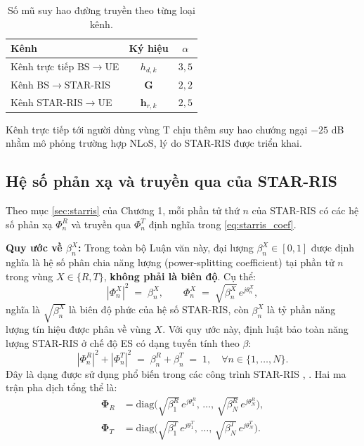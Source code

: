 \begin{table}[t]
\centering
\caption{Số mũ suy hao đường truyền theo từng loại kênh.}
\label{tab:pathloss_param}
\begin{tabular}{p{6cm} c c}
\toprule
\textbf{Kênh} & \textbf{Ký hiệu} & \textbf{$\alpha$} \\
\midrule
Kênh trực tiếp BS$\to$UE                & $h_{d,k}$              & $3{,}5$ \\
Kênh BS$\to$STAR-RIS                    & $\mathbf{G}$           & $2{,}2$ \\
Kênh STAR-RIS$\to$UE                    & $\mathbf{h}_{r,k}$     & $2{,}5$ \\
\bottomrule
\end{tabular}
\end{table}

Kênh trực tiếp tới người dùng vùng T chịu thêm suy hao chướng ngại
$-25$ dB nhằm mô phỏng trường hợp NLoS, lý do STAR-RIS được triển khai.

\subsection{Hệ số phản xạ và truyền qua của STAR-RIS}
\label{sec:star_ris_coef}

Theo mục \ref{sec:starris} của Chương 1, mỗi phần tử thứ $n$ của
STAR-RIS có các hệ số phản xạ $\Phi_n^R$ và truyền qua $\Phi_n^T$ định
nghĩa trong \eqref{eq:starris_coef}.

\textbf{Quy ước về $\beta_n^X$:} Trong toàn bộ Luận văn này, đại lượng
$\beta_n^X \in [0,1]$ được định nghĩa là hệ số phân chia năng lượng
(power-splitting coefficient) tại phần tử $n$ trong vùng
$X \in \{R, T\}$, \textbf{không phải là biên độ}. Cụ thể:
\begin{equation}
|\Phi_n^X|^2 \;=\; \beta_n^X, \qquad
\Phi_n^X \;=\; \sqrt{\beta_n^X}\,e^{j\theta_n^X},
\label{eq:beta_def}
\end{equation}
nghĩa là $\sqrt{\beta_n^X}$ là biên độ phức của hệ số STAR-RIS, còn
$\beta_n^X$ là tỷ phần năng lượng tín hiệu được phân về vùng $X$. Với
quy ước này, định luật bảo toàn năng lượng STAR-RIS ở chế độ ES có
dạng tuyến tính theo $\beta$:
\begin{equation}
|\Phi_n^R|^2 + |\Phi_n^T|^2 \;=\; \beta_n^R + \beta_n^T \;=\; 1,
\quad \forall n \in \{1,\ldots,N\}.
\label{eq:es_constraint_full}
\end{equation}
Đây là dạng được sử dụng phổ biến trong các công trình STAR-RIS
\cite{liu2021starris}, \cite{mu2022simultaneously}. Hai ma trận pha dịch tổng
thể là:
\begin{align}
  \boldsymbol{\Phi}_R &= \mathrm{diag}\!\big(\sqrt{\beta_1^R}\,e^{j\theta_1^R},\,
  \ldots,\, \sqrt{\beta_N^R}\,e^{j\theta_N^R}\big), \label{eq:Phi_R}\\
  \boldsymbol{\Phi}_T &= \mathrm{diag}\!\big(\sqrt{\beta_1^T}\,e^{j\theta_1^T},\,
  \ldots,\, \sqrt{\beta_N^T}\,e^{j\theta_N^T}\big). \label{eq:Phi_T}
\end{align}

